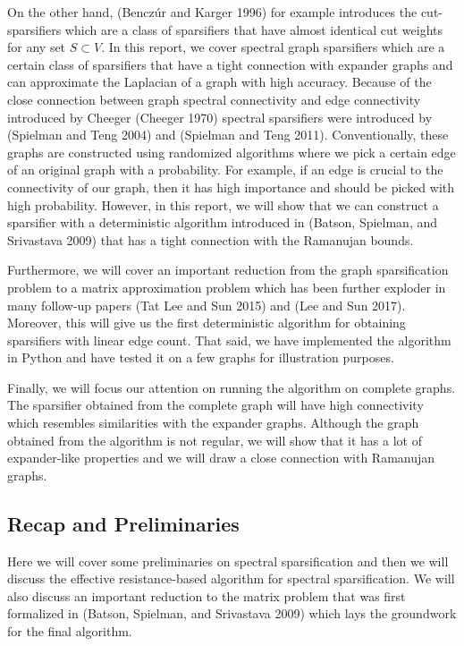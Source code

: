 \documentclass[
  letterpaper,
  DIV=11,
  numbers=noendperiod]{scrartcl}
\theoremstyle{plain}
\theoremstyle{plain}
\theoremstyle{plain}
\theoremstyle{definition}
\theoremstyle{remark}
\begin{document}
On the other hand, (Benczúr and Karger 1996) for example introduces the
cut-sparsifiers which are a class of sparsifiers that have almost
identical cut weights for any set \(S \subset V\). In this report, we
cover spectral graph sparsifiers which are a certain class of
sparsifiers that have a tight connection with expander graphs and can
approximate the Laplacian of a graph with high accuracy. Because of the
close connection between graph spectral connectivity and edge
connectivity introduced by Cheeger (Cheeger 1970) spectral sparsifiers
were introduced by (Spielman and Teng 2004) and (Spielman and Teng
2011). Conventionally, these graphs are constructed using randomized
algorithms where we pick a certain edge of an original graph with a
probability. For example, if an edge is crucial to the connectivity of
our graph, then it has high importance and should be picked with high
probability. However, in this report, we will show that we can construct
a sparsifier with a deterministic algorithm introduced in (Batson,
Spielman, and Srivastava 2009) that has a tight connection with the
Ramanujan bounds.

Furthermore, we will cover an important reduction from the graph
sparsification problem to a matrix approximation problem which has been
further exploder in many follow-up papers (Tat Lee and Sun 2015) and
(Lee and Sun 2017). Moreover, this will give us the first deterministic
algorithm for obtaining sparsifiers with linear edge count. That said,
we have implemented the algorithm in Python and have tested it on a few
graphs for illustration purposes.

Finally, we will focus our attention on running the algorithm on
complete graphs. The sparsifier obtained from the complete graph will
have high connectivity which resembles similarities with the expander
graphs. Although the graph obtained from the algorithm is not regular,
we will show that it has a lot of expander-like properties and we will
draw a close connection with Ramanujan graphs.

\hypertarget{recap-and-preliminaries}{%
\subsection{Recap and Preliminaries}\label{recap-and-preliminaries}}

Here we will cover some preliminaries on spectral sparsification and
then we will discuss the effective resistance-based algorithm for
spectral sparsification. We will also discuss an important reduction to
the matrix problem that was first formalized in (Batson, Spielman, and
Srivastava 2009) which lays the groundwork for the final algorithm.
\end{document}
